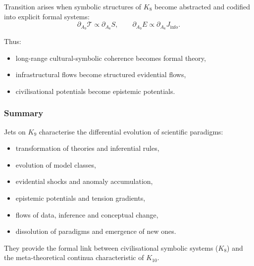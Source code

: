 Transition arises when symbolic structures of $K_8$ become abstracted
and codified into explicit formal systems:
\[
\partial_{A_9}\mathcal{T}
\propto
\partial_{A_8}S,
\qquad
\partial_{A_9}E
\propto
\partial_{A_8}J_{\mathrm{info}}.
\]

Thus:
\begin{itemize}
    \item long-range cultural-symbolic coherence becomes formal theory,
    \item infrastructural flows become structured evidential flows,
    \item civilisational potentials become epistemic potentials.
\end{itemize}


\subsubsection{Summary}

Jets on $K_9$ characterise the differential evolution of scientific
paradigms:
\begin{itemize}
    \item transformation of theories and inferential rules,
    \item evolution of model classes,
    \item evidential shocks and anomaly accumulation,
    \item epistemic potentials and tension gradients,
    \item flows of data, inference and conceptual change,
    \item dissolution of paradigms and emergence of new ones.
\end{itemize}

They provide the formal link between civilisational symbolic systems
($K_8$) and the meta-theoretical continua characteristic of $K_{10}$.
